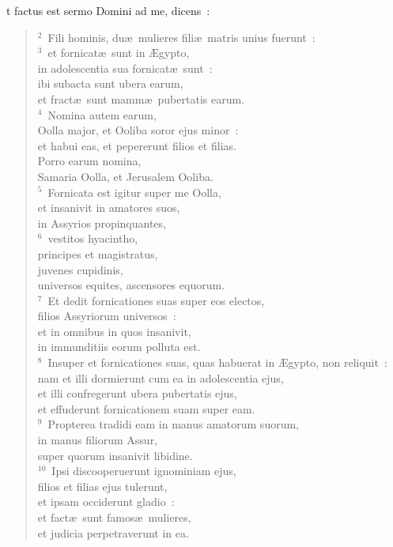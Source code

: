 \bchapter
{}t factus est sermo Domini ad me, dicens~:
\begin{verse}\vspace{6pt}${}^{2}$~Fili hominis, du\ae\ mulieres fili\ae\ matris unius fuerunt~:\\
${}^{3}$~et fornicat\ae\ sunt in \AE gypto,\\ in adolescentia sua fornicat\ae\ sunt~:\\ ibi subacta sunt ubera earum,\\ et fract\ae\ sunt mamm\ae\ pubertatis earum.\\
${}^{4}$~Nomina autem earum,\\ Oolla major, et Ooliba soror ejus minor~:\\ et habui eas, et pepererunt filios et filias.\\ Porro earum nomina,\\ Samaria Oolla, et Jerusalem Ooliba.\\
${}^{5}$~Fornicata est igitur super me Oolla,\\ et insanivit in amatores suos,\\ in Assyrios propinquantes,\\
${}^{6}$~vestitos hyacintho,\\ principes et magistratus,\\ juvenes cupidinis,\\ universos equites, ascensores equorum.\\
${}^{7}$~Et dedit fornicationes suas super eos electos,\\ filios Assyriorum universos~:\\ et in omnibus in quos insanivit,\\ in immunditiis eorum polluta est.\\
${}^{8}$~Insuper et fornicationes suas, quas habuerat in \AE gypto, non reliquit~:\\ nam et illi dormierunt cum ea in adolescentia ejus,\\ et illi confregerunt ubera pubertatis ejus,\\ et effuderunt fornicationem suam super eam.\\
${}^{9}$~Propterea tradidi eam in manus amatorum suorum,\\ in manus filiorum Assur,\\ super quorum insanivit libidine.\\
${}^{10}$~Ipsi discooperuerunt ignominiam ejus,\\ filios et filias ejus tulerunt,\\ et ipsam occiderunt gladio~:\\ et fact\ae\ sunt famos\ae\ mulieres,\\ et judicia perpetraverunt in ea.\\

\end{verse}
